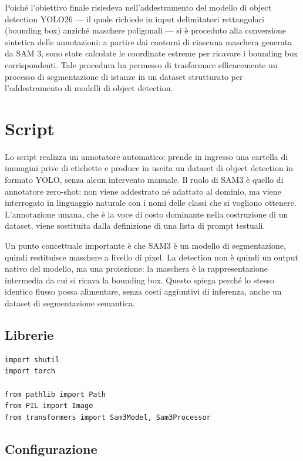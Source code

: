 Poiché l'obiettivo finale risiedeva nell'addestramento del modello di object detection YOLO26 — il quale richiede in input delimitatori rettangolari (bounding box)
anziché maschere poligonali — si è proceduto alla conversione sintetica delle annotazioni: a partire dai contorni di ciascuna maschera generata da SAM 3,
sono state calcolate le coordinate estreme per ricavare i bounding box corrispondenti.
Tale procedura ha permesso di trasformare efficacemente un processo di segmentazione di istanze in un dataset strutturato per l'addestramento di modelli di object detection.

\section{Script}

Lo script realizza un annotatore automatico: prende in ingresso una cartella di immagini prive di etichette e produce in uscita un dataset di object detection in formato YOLO,
senza alcun intervento manuale. Il ruolo di SAM3 è quello di annotatore zero-shot:
non viene addestrato né adattato al dominio, ma viene interrogato in linguaggio naturale con i nomi delle classi che si vogliono ottenere.
L'annotazione umana, che è la voce di costo dominante nella costruzione di un dataset, viene sostituita dalla definizione di una lista di prompt testuali.

Un punto concettuale importante è che SAM3 è un modello di segmentazione, quindi restituisce maschere a livello di pixel.
La detection non è quindi un output nativo del modello, ma una proiezione: la maschera è la rappresentazione intermedia da cui si ricava la bounding box.
Questo spiega perché lo stesso identico flusso possa alimentare, senza costi aggiuntivi di inferenza, anche un dataset di segmentazione semantica.

\newpage

\subsection{Librerie}

\begin{lstlisting}
import shutil
import torch

from pathlib import Path
from PIL import Image
from transformers import Sam3Model, Sam3Processor
\end{lstlisting}

\subsection{Configurazione}

